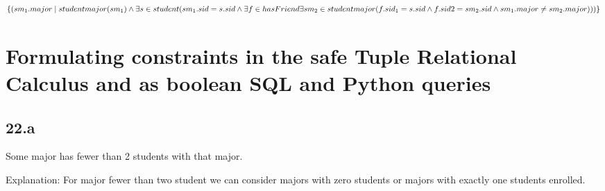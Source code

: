 \documentclass{article}
\begin{document}
$\{(sm_1.major \mid studentmajor(sm_1) \land \\
\exists s \in student(sm_1.sid=s.sid \land \exists f \in hasFriend \exists sm_2 \in studentmajor(f.sid_1=s.sid \land f.sid2=sm_2.sid \land sm_1.major \neq sm_2.major)))\}$

\section{Formulating constraints in the safe Tuple Relational Calculus and as boolean SQL and Python queries}

\subsection*{22.a}
Some major has fewer than 2 students with that major.
\vspace{10pt}




Explanation: For major fewer than two student we can consider majors with zero students or majors with exactly one students enrolled.
\vspace{10pt}

\end{document}
